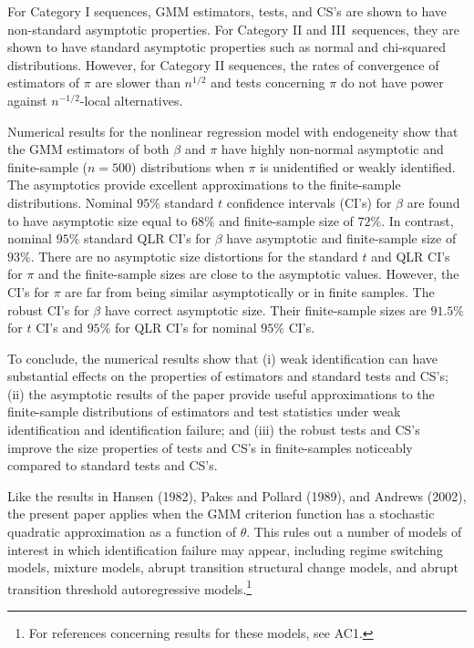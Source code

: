 \documentclass[12pt,thmsb,titlepage,final,oneside,letterpaper]{article}
\begin{document}
For Category I sequences, GMM estimators, tests, and CS's are shown to have
non-standard asymptotic properties. For Category II and III\ sequences, they
are shown to have standard asymptotic properties such as normal and
chi-squared distributions. However, for Category II sequences, the rates of
convergence of estimators of $\pi $ are slower than $n^{1/2}$ and tests
concerning $\pi $ do not have power against $n^{-1/2}$-local alternatives.

Numerical results for the nonlinear regression model with endogeneity show
that the GMM estimators of both $\beta $ and $\pi $ have highly non-normal
asymptotic and finite-sample ($n=500$) distributions when $\pi $ is
unidentified or weakly identified. The asymptotics provide excellent
approximations to the finite-sample distributions. Nominal $95\%$ standard $%
t $ confidence intervals (CI's) for $\beta $ are found to have asymptotic
size equal to $68\%$ and finite-sample size of $72\%.$ In contrast, nominal $%
95\%$ standard QLR CI's for $\beta $ have asymptotic and finite-sample size
of $93\%.$ There are no asymptotic size distortions for the standard $t$ and
QLR CI's for $\pi $ and the finite-sample sizes are close to the asymptotic
values. However, the CI's for $\pi $ are far from being similar
asymptotically or in finite samples. The robust CI's for $\beta $ have
correct asymptotic size. Their finite-sample sizes are $91.5\%$ for $t$ CI's
and $95\%$ for QLR CI's for nominal $95\%$ CI's.

To conclude, the numerical results show that (i) weak identification can
have substantial effects on the properties of estimators and standard tests
and CS's; (ii) the asymptotic results of the paper provide useful
approximations to the finite-sample distributions of estimators and test
statistics under weak identification and identification failure; and (iii)
the robust tests and CS's improve the size properties of tests and CS's in
finite-samples noticeably compared to standard tests and CS's.

Like the results in Hansen (1982), Pakes and Pollard (1989), and Andrews
(2002), the present paper applies when the GMM criterion function has a
stochastic quadratic approximation as a function of $\theta .$ This rules
out a number of models of interest in which identification failure may
appear, including regime switching models, mixture models, abrupt transition
structural change models, and abrupt transition threshold autoregressive
models.\footnote{%
For references concerning results for these models, see AC1.}
\end{document}
